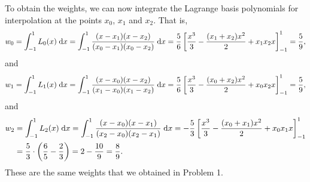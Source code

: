 \documentclass{homework}
\begin{document}
	To obtain the weights, we can now integrate the Lagrange basis polynomials for interpolation at the points $x_0$, $x_1$ and $x_2$. That is,
	\begin{equation}
		w_0 = \int_{-1}^1 L_0(x)\;\text{d} x = \int_{-1}^1 \frac{(x-x_1)(x-x_2)}{(x_0 - x_1)(x_0 - x_2)}\;\text{d} x = \frac{5}{6}\left[\frac{x^3}{3} - \frac{(x_1+x_2)x^2}{2} + x_1x_2x\right]_{-1}^1 = \frac{5}{9},
	\end{equation}
	and
	\begin{equation}
		w_1 =\int_{-1}^1 L_1(x)\;\text{d} x = \int_{-1}^1 \frac{(x-x_0)(x-x_2)}{(x_1 - x_0)(x_1 - x_2)}\;\text{d} x = \frac{5}{6}\left[\frac{x^3}{3} - \frac{(x_0 + x_2)x^2}{2} + x_0x_2x\right]_{-1}^1 = \frac{5}{9},
	\end{equation}
	and
	\begin{align}
		w_2 &= \int_{-1}^1 L_2(x) \;\text{d} x = \int_{-1}^1\frac{(x-x_0)(x-x_1)}{(x_2-x_0)(x_2-x_1)}\;\text{d} x = -\frac{5}{3}\left[\frac{x^3}{3} - \frac{(x_0+x_1)x^2}{2} + x_0x_1x\right]_{-1}^1 \\
		&=\frac{5}{3}\cdot\left(\frac{6}{5} - \frac{2}{3}\right) = 2 - \frac{10}{9} = \frac{8}{9}.
	\end{align}
	These are the same weights that we obtained in Problem 1.
	
\end{document}
